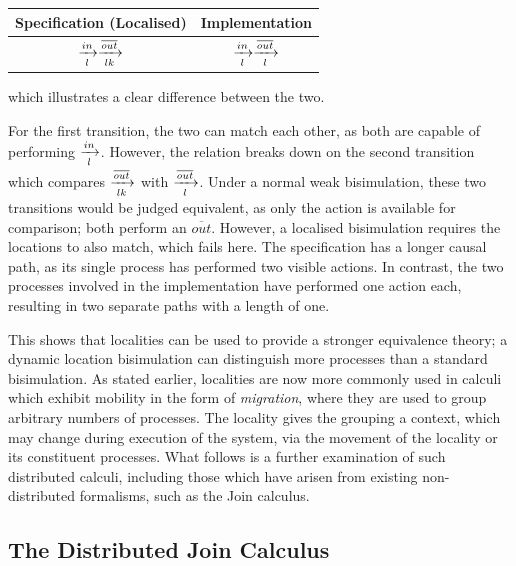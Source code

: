 \begin{center}
\begin{tabular}{c|c}
Specification (Localised) & Implementation \\
\hline
$\xrightarrow[l]{in} \xrightarrow[lk]{\overline{out}}$ &
$\xrightarrow[l]{in} \xrightarrow[l]{\overline{out}}$
\end{tabular}
\end{center}

\noindent which illustrates a clear difference between the two.

For the first transition, the two can match each other, as both are
capable of performing $\xrightarrow[l]{in}$.  However, the relation
breaks down on the second transition which compares $\xrightarrow[lk]{\overline{out}}$
with $\xrightarrow[l]{\overline{out}}$.  Under a normal weak
bisimulation, these two transitions would be judged equivalent, as only
the action is available for comparison; both perform an
$\overline{out}$.  However, a localised bisimulation requires the
locations to also match, which fails here.  The specification has a
longer causal path, as its single process has performed two visible
actions.  In contrast, the two processes involved in the implementation
have performed one action each, resulting in two separate paths with a
length of one.

This shows that localities can be used to provide a stronger equivalence
theory; a dynamic location bisimulation can distinguish more processes
than a standard bisimulation.  As stated earlier, localities are now
more commonly used in calculi which exhibit mobility in the form of
\emph{migration}, where they are used to group arbitrary numbers of
processes.  The locality gives the grouping a context, which may change
during execution of the system, via the movement of the locality or its
constituent processes.  What follows is a further examination of such
distributed calculi, including those which have arisen from existing
non-distributed formalisms, such as the Join calculus.



\subsection{The Distributed Join Calculus}

